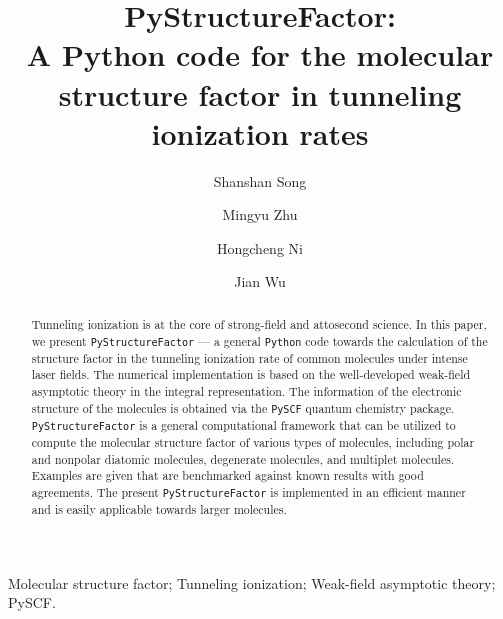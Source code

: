 \documentclass[preprint,12pt]{elsarticle} %
\begin{document}
\begin{frontmatter}

\title{PyStructureFactor:\texorpdfstring{\\}{ }A Python code for the molecular structure factor in tunneling ionization rates}

\author[a]{Shanshan Song}
\author[a,b]{Mingyu Zhu}
\author[a,c,d]{Hongcheng Ni}
\author[a,c,d,e]{Jian Wu}

\address[a]{State Key Laboratory of Precision Spectroscopy, East China Normal University, Shanghai 200241, China}
\address[b]{School of Physics and Electronic Science, East China Normal University, Shanghai 200241, China}
\address[c]{NYU-ECNU Joint Institute of Physics, New York University at Shanghai, Shanghai 200062, China}
\address[d]{Collaborative Innovation Center of Extreme Optics, Shanxi University, Taiyuan, Shanxi 030006, China}
\address[e]{CAS Center for Excellence in Ultra-intense Laser Science, Shanghai 201800, China}


\begin{abstract}
Tunneling ionization is at the core of strong-field and attosecond science. In this paper, we present \texttt{PyStructureFactor} --- a general \texttt{Python} code towards the calculation of the structure factor in the tunneling ionization rate of common molecules under intense laser fields. The numerical implementation is based on the well-developed weak-field asymptotic theory in the integral representation. The information of the electronic structure of the molecules is obtained via the \texttt{PySCF} quantum chemistry package. \texttt{PyStructureFactor} is a general computational framework that can be utilized to compute the molecular structure factor of various types of molecules, including polar and nonpolar diatomic molecules, degenerate molecules, and multiplet molecules. Examples are given that are benchmarked against known results with good agreements. The present \texttt{PyStructureFactor} is implemented in an efficient manner and is easily applicable towards larger molecules.
\end{abstract}

\begin{keyword}
Molecular structure factor; Tunneling ionization; Weak-field asymptotic theory; PySCF.
\end{keyword}

\end{frontmatter}
\end{document}
